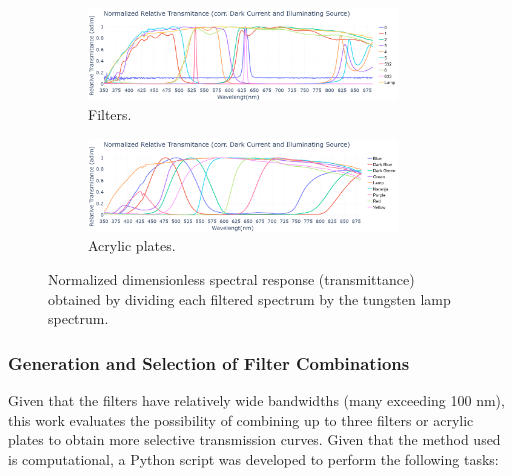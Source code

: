 \begin{figure}[H]
    \centering
    \begin{subfigure}{\textwidth}
        \centering
        \includegraphics[trim=0mm 0mm 0mm 25mm, clip, width=0.9\textwidth]{Figures/C3/filtros_respuestaspec.png}
        \caption{Filters.}
        \label{fig:filtros_espectros}
    \end{subfigure}
    \vspace{1em}
    \begin{subfigure}{\textwidth}
        \centering
        \includegraphics[trim=0mm 0mm 0mm 25mm, clip, width=0.9\textwidth]{Figures/C3/laminas_respuestaspec.png}
        \caption{Acrylic plates.}
        \label{fig:laminas_espectros}
    \end{subfigure}
    \caption{Normalized dimensionless spectral response (transmittance) obtained by dividing each filtered spectrum by the tungsten lamp spectrum.}
    \label{ig:filtros_laminas_espectros_relativos}
\end{figure}

\subsubsection{Generation and Selection of Filter Combinations}
\label{subsub:combinaciones_filtros}

\noindent Given that the filters have relatively wide bandwidths (many exceeding 100 nm), this work evaluates the possibility of combining up to three filters or acrylic plates to obtain more selective transmission curves. Given that the method used is computational, a Python script was developed to perform the following tasks: 

